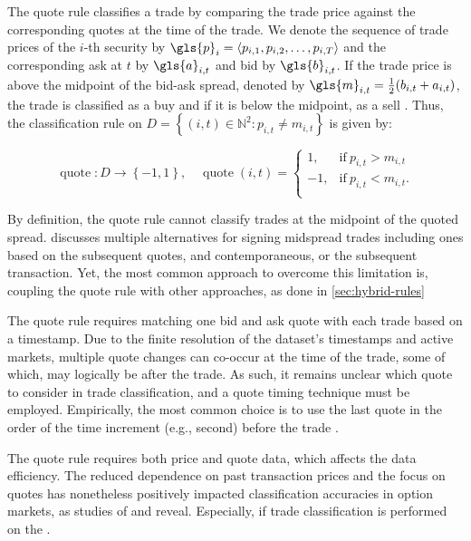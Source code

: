 The quote rule classifies a trade by comparing the trade price against the corresponding quotes at the time of the trade. We denote the sequence of trade prices of the $i$-th security by $\gls{p}_i = \langle p_{i,1},p_{i,2},\dots,p_{i,T}\rangle$ and the corresponding ask at $t$ by $\gls{a}_{i,t}$ and bid by $\gls{b}_{i,t}$. If the trade price is above the midpoint of the bid-ask spread, denoted by $\gls{m}_{i,t} = \tfrac{1}{2}(b_{i,t} + a_{i,t})$, the trade is classified as a buy and if it is below the midpoint, as a sell \autocite[][41]{harrisDayEndTransactionPrice1989}. Thus, the classification rule on $D = \left\{(i, t) \in \mathbb{N}^2: p_{i,t} \neq m_{i,t}\right\}$ is given by:

\begin{equation}
\operatorname{quote}\colon D \to \left\{-1, 1\right\},\quad
\operatorname{quote}(i, t)=
\begin{cases}
1,  & \text{if}\ p_{i, t}>m_{i, t}\\
-1, & \text{if}\ p_{i, t}<m_{i, t}. \\
\end{cases}
\end{equation}

By definition, the quote rule cannot classify trades at the midpoint of the quoted spread. \textcite[][241]{hasbrouckTradesQuotesInventories1988} discusses multiple alternatives for signing midspread trades including ones based on the subsequent quotes, and contemporaneous, or the subsequent transaction. Yet, the most common approach to overcome this limitation is, coupling the quote rule with other approaches, as done in \cref{sec:hybrid-rules}

The quote rule requires matching one bid and ask quote with each trade based on a timestamp. Due to the finite resolution of the dataset's timestamps and active markets, multiple quote changes can co-occur at the time of the trade, some of which, may logically be after the trade. As such, it remains unclear which quote to consider in trade classification, and a quote timing technique must be employed. Empirically, the most common choice is to use the last quote in the order of the time increment (e.g., second) before the trade \autocite[][1765]{holdenLiquidityMeasurementProblems2014}.

The quote rule requires both price and quote data, which affects the data efficiency. The reduced dependence on past transaction prices and the focus on quotes has nonetheless positively impacted classification accuracies in option markets, as studies of \textcite[][886]{savickasInferringDirectionOption2003} and \textcite[][3]{grauerOptionTradeClassification2022} reveal. Especially, if trade classification is performed on the .



